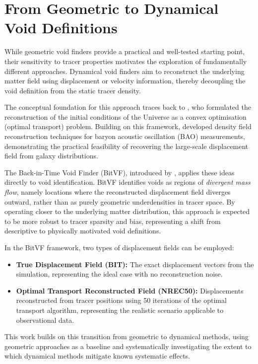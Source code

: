 \documentclass[12pt]{report}
\begin{document}
\section{From Geometric to Dynamical Void Definitions}

While geometric void finders provide a practical and well-tested starting point, their sensitivity to tracer properties motivates the exploration of fundamentally different approaches. Dynamical void finders aim to reconstruct the underlying matter field using displacement or velocity information, thereby decoupling the void definition from the static tracer density.

The conceptual foundation for this approach traces back to \citet{Brenier2003}, who formulated the reconstruction of the initial conditions of the Universe as a convex optimisation (optimal transport) problem. Building on this framework, \citet{Eisenstein2007} developed density field reconstruction techniques for baryon acoustic oscillation (BAO) measurements, demonstrating the practical feasibility of recovering the large-scale displacement field from galaxy distributions.

The Back-in-Time Void Finder (BitVF), introduced by \citet{Sartori2025}, applies these ideas directly to void identification. BitVF identifies voids as regions of \emph{divergent mass flow}, namely locations where the reconstructed displacement field diverges outward, rather than as purely geometric underdensities in tracer space. By operating closer to the underlying matter distribution, this approach is expected to be more robust to tracer sparsity and bias, representing a shift from descriptive to physically motivated void definitions.

In the BitVF framework, two types of displacement fields can be employed:
\begin{itemize}
    \item \textbf{True Displacement Field (BIT):} The exact displacement vectors from the simulation, representing the ideal case with no reconstruction noise.
    \item \textbf{Optimal Transport Reconstructed Field (NREC50):} Displacements reconstructed from tracer positions using 50 iterations of the optimal transport algorithm, representing the realistic scenario applicable to observational data.
\end{itemize}

This work builds on this transition from geometric to dynamical methods, using geometric approaches as a baseline and systematically investigating the extent to which dynamical methods mitigate known systematic effects.
\end{document}
